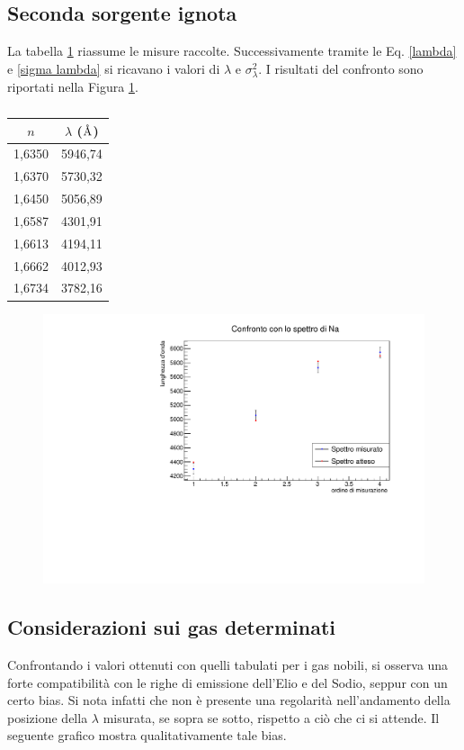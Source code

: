 \subsection{Seconda sorgente ignota}
La tabella \ref{tabella 8} riassume le misure raccolte. Successivamente tramite le Eq. \ref{lambda} e \ref{sigma lambda} si ricavano i valori di $\lambda$ e $\sigma^2_\lambda$. I risultati del confronto sono riportati nella Figura  \ref{confronto 2}.
\begin{table}[h!]
    \centering
    \begin{tabular}{cc}
    \toprule
    $n$ & $\lambda$ ($\mbox{\normalfont\AA}$)\\
    \midrule
    1,6350	&5946,74\\
    1,6370	&5730,32\\
    1,6450	&5056,89\\
    1,6587	&4301,91\\
    1,6613	&4194,11\\
    1,6662	&4012,93\\
    1,6734	&3782,16\\
    \bottomrule
    \end{tabular}
    \caption{}
    \label{tabella 8}
\end{table}
\begin{figure}[h!]
    \centering
    \includegraphics[scale=.6]{Immagini/Confronto 2.pdf}
    \caption{}
    \label{confronto 2}
\end{figure}
\subsection{Considerazioni sui gas determinati}
Confrontando i valori ottenuti con quelli tabulati per i gas nobili, si osserva una forte compatibilità con le righe di emissione dell’Elio e del Sodio, seppur con un certo bias. Si nota infatti che non è presente una regolarità nell'andamento della posizione della $\lambda$ misurata, se sopra se sotto, rispetto a ciò che ci si attende. Il seguente grafico mostra qualitativamente tale bias.

